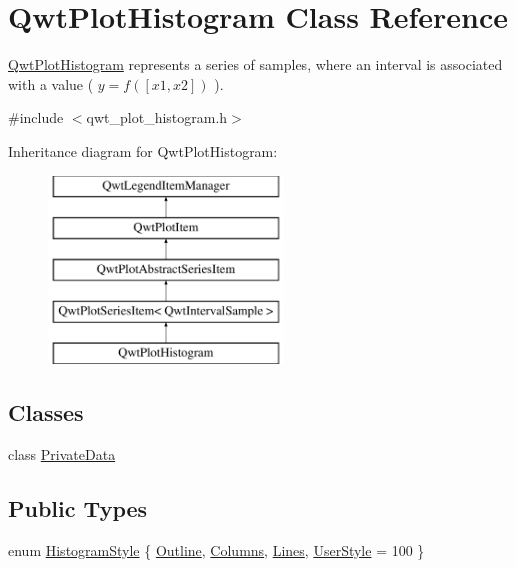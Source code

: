 \hypertarget{class_qwt_plot_histogram}{\section{Qwt\-Plot\-Histogram Class Reference}
\label{class_qwt_plot_histogram}
}


\hyperlink{class_qwt_plot_histogram}{Qwt\-Plot\-Histogram} represents a series of samples, where an interval is associated with a value ( $y = f([x1,x2])$ ).  




{\ttfamily \#include $<$qwt\-\_\-plot\-\_\-histogram.\-h$>$}

Inheritance diagram for Qwt\-Plot\-Histogram\-:\begin{figure}[H]
\begin{center}
\leavevmode
\includegraphics[height=5.000000cm]{class_qwt_plot_histogram}
\end{center}
\end{figure}
\subsection*{Classes}
\begin{DoxyCompactItemize}
\item 
class \hyperlink{class_qwt_plot_histogram_1_1_private_data}{Private\-Data}
\end{DoxyCompactItemize}
\subsection*{Public Types}
\begin{DoxyCompactItemize}
\item 
enum \hyperlink{class_qwt_plot_histogram_a3ba21c3aef994daf7b848ccf71b0dbc5}{Histogram\-Style} \{ \hyperlink{class_qwt_plot_histogram_a3ba21c3aef994daf7b848ccf71b0dbc5ab6ef3ed19f600d5d67d34eedf4cf33a9}{Outline}, 
\hyperlink{class_qwt_plot_histogram_a3ba21c3aef994daf7b848ccf71b0dbc5a9cd056b6b9881b07c625756488487362}{Columns}, 
\hyperlink{class_qwt_plot_histogram_a3ba21c3aef994daf7b848ccf71b0dbc5a62b3af66b59203102394dbe1711a7a58}{Lines}, 
\hyperlink{class_qwt_plot_histogram_a3ba21c3aef994daf7b848ccf71b0dbc5a586b4f119cfbfe62de143c836227c06e}{User\-Style} = 100
 \}
\end{DoxyCompactItemize}
